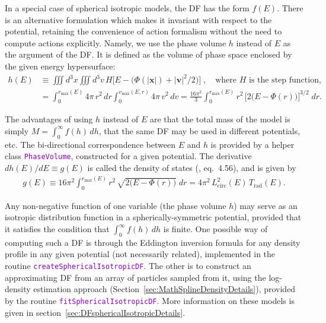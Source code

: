 \documentclass[12pt]{article}
\newcommand{\ttt}[1]{\textcolor{darkviolet}{\texttt{#1}}}
\newcommand{\bv}{\boldsymbol{v}}
\newcommand{\bx}{\boldsymbol{x}}
\begin{document}
In a special case of spherical isotropic models, the DF has the form $f(E)$. There is an alternative formulation which makes it invariant with respect to the potential, retaining the convenience of action formalism without the need to compute actions explicitly. Namely, we use the phase volume $h$ instead of $E$ as the argument of the DF. It is defined as the volume of phase space enclosed by the given energy hypersurface:
\begin{align*}
h(E) &\equiv \iiint d^3x \iiint d^3v\, H\Big[E - \big(\Phi(|\bx|)+|\bv|^2/2\big)\Big] \;,\quad
\mbox{where $H$ is the step function,} \\
&= \int_0^{r_\mathrm{max}(E)} 4\pi\,r^2\,dr \int_0^{v_\mathrm{max}(E,r)} 4\pi\, v^2\,dv =
\frac{16\pi^2}{3} \int_0^{r_\mathrm{max}(E)} r^2\, \Big[2\big(E-\Phi(r)\big)\Big]^{3/2}\;dr.
\end{align*}

The advantages of using $h$ instead of $E$ are that the total mass of the model is simply $M=\int_0^\infty f(h)\,dh$, that the same DF may be used in different potentials, etc. The bi-directional correspondence between $E$ and $h$ is provided by a helper class \ttt{PhaseVolume}, constructed for a given potential. The derivative $dh(E)/dE \equiv g(E)$ is called the density of states (\cite{BinneyTremaine}, eq.~4.56), and is given by
\begin{align*}
g(E) \equiv 16\pi^2 \int_0^{r_\mathrm{max}(E)} r^2\, \sqrt{2\big(E-\Phi(r)\big)}\;dr 
= 4\pi^2\,L^2_\mathrm{circ}(E)\,T_\mathrm{rad}(E).
\end{align*}

Any non-negative function of one variable (the phase volume $h$) may serve as an isotropic distribution function in a spherically-symmetric potential, provided that it satisfies the condition that $\int_0^\infty f(h)\, dh$ is finite. 
One possible way of computing such a DF is through the Eddington inversion formula for any density profile in any given potential (not necessarily related), implemented in the routine \ttt{createSphericalIsotropicDF}. The other is to construct an approximating DF from an array of particles sampled from it, using the log-density estimation approach (Section~\ref{sec:MathSplineDensityDetails}), provided by the routine \ttt{fitSphericalIsotropicDF}.
More information on these models is given in section~\ref{sec:DFsphericalIsotropicDetails}.
\end{document}
